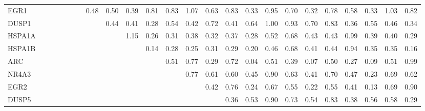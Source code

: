 \begin{longtable}{lrrrrrrrrrrrrrrrrrrrrrrr}
EGR1   &             &            &            &             &              &            &        0.48 &         0.50 &         0.39 &      0.81 &        0.83 &       1.07 &        0.63 &        0.83 &         0.33 &        0.95 &      0.70 &        0.32 &       0.78 &         0.58 &        0.33 &       1.03 &       0.82 \\
DUSP1  &             &            &            &             &              &            &             &         0.44 &         0.41 &      0.28 &        0.54 &       0.42 &        0.72 &        0.41 &         0.64 &        1.00 &      0.93 &        0.70 &       0.83 &         0.36 &        0.55 &       0.46 &       0.34 \\
HSPA1A &             &            &            &             &              &            &             &              &         1.15 &      0.26 &        0.31 &       0.38 &        0.32 &        0.37 &         0.28 &        0.52 &      0.68 &        0.43 &       0.43 &         0.99 &        0.39 &       0.40 &       0.29 \\
HSPA1B &             &            &            &             &              &            &             &              &              &      0.14 &        0.28 &       0.25 &        0.31 &        0.29 &         0.20 &        0.46 &      0.68 &        0.41 &       0.44 &         0.94 &        0.35 &       0.35 &       0.16 \\
ARC    &             &            &            &             &              &            &             &              &              &           &        0.51 &       0.77 &        0.29 &        0.72 &         0.04 &        0.51 &      0.39 &        0.07 &       0.50 &         0.27 &        0.09 &       0.51 &       0.99 \\
NR4A3  &             &            &            &             &              &            &             &              &              &           &             &       0.77 &        0.61 &        0.60 &         0.45 &        0.90 &      0.63 &        0.41 &       0.70 &         0.47 &        0.23 &       0.69 &       0.62 \\
EGR2   &             &            &            &             &              &            &             &              &              &           &             &            &        0.42 &        0.76 &         0.24 &        0.67 &      0.55 &        0.22 &       0.55 &         0.41 &        0.13 &       0.69 &       0.90 \\
DUSP5  &             &            &            &             &              &            &             &              &              &           &             &            &             &        0.36 &         0.53 &        0.90 &      0.73 &        0.54 &       0.83 &         0.38 &        0.56 &       0.58 &       0.29 \\

\end{longtable}
